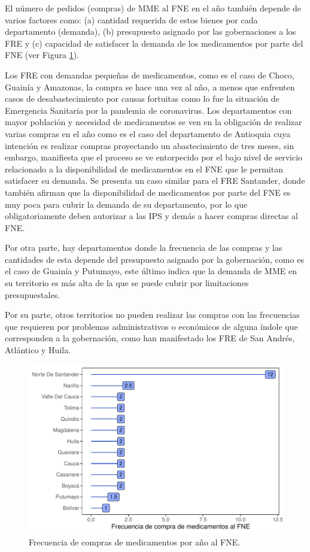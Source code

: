 \documentclass[
]{book}
\begin{document}
El número de pedidos (compras) de MME al FNE en el año también depende de varios factores como: (a) cantidad requerida de estos bienes por cada departamento (demanda), (b) presupuesto asignado por las gobernaciones a los FRE y (c) capacidad de satisfacer la demanda de los medicamentos por parte del FNE (ver Figura \ref{fig:FrecComprasFNR}).

Los FRE con demandas pequeñas de medicamentos, como es el caso de Choco, Guainía y Amazonas, la compra se hace una vez al año, a menos que enfrenten casos de desabastecimiento por causas fortuitas como lo fue la situación de Emergencia Sanitaria por la pandemia de coronavirus. Los departamentos con mayor población y necesidad de medicamentos se ven en la obligación de realizar varias compras en el año como es el caso del departamento de Antioquia cuya intención es realizar compras proyectando un abastecimiento de tres meses, sin embargo, manifiesta que el proceso se ve entorpecido por el bajo nivel de servicio relacionado a la disponibilidad de medicamentos en el FNE que le permitan satisfacer su demanda. Se presenta un caso similar para el FRE Santander, donde también afirman que la disponibilidad de medicamentos por parte del FNE es muy poca para cubrir la demanda de su departamento, por lo que obligatoriamente deben autorizar a las IPS y demás a hacer compras directas al FNE.

Por otra parte, hay departamentos donde la frecuencia de las compras y las cantidades de esta depende del presupuesto asignado por la gobernación, como es el caso de Guainía y Putumayo, este último indica que la demanda de MME en su territorio es más alta de la que se puede cubrir por limitaciones presupuestales.

Por su parte, otros territorios no pueden realizar las compras con las frecuencias que requieren por problemas administrativos o económicos de alguna índole que corresponden a la gobernación, como han manifestado los FRE de San Andrés, Atlántico y Huila.

\begin{figure}[t]

{\centering \includegraphics[width=0.9\linewidth]{InformeFinal_files/figure-latex/FrecComprasFNR-1} 

}

\caption{Frecuencia de compras de medicamentos por año al FNE.}\label{fig:FrecComprasFNR}
\end{figure}
\end{document}
